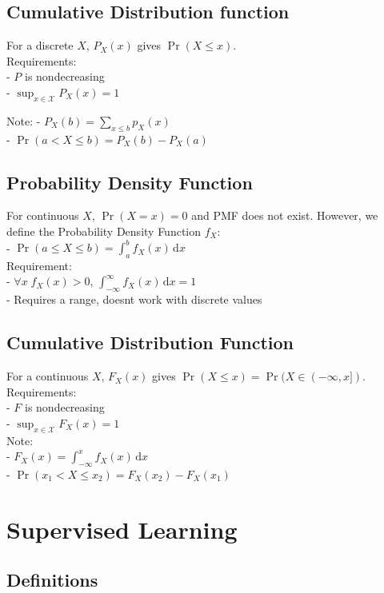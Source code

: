 \documentclass[10pt,landscape,a4paper]{cheatsheet}
\newcommand{\diff}{\mathrm{\,d}}
\begin{document}
  \subsection{Cumulative Distribution function} 
  For a discrete $X$, $P_{X}(x)$ gives $\Pr(X \le x)$.\\
   Requirements:\\
    - $P$ is nondecreasing\\
    - $\sup_{x \in \mathcal{X}} P_{X}(x) = 1$

   Note:
    - $P_X(b) = \sum_{x \le b} p_X(x)$\\
    - $\Pr(a < X \le b) = P_X(b) - P_X(a)$

   \subsection{Probability Density Function}
   For continuous $X$, $\Pr(X = x) = 0$ and PMF does not exist. However, we define the Probability Density Function $f_X$:\\
    - $\Pr(a \le X \le b) = \int_{a}^{b} f_X(x) \diff x$\\
   Requirement:\\
    - $\forall x \;f_X(x) > 0$, $\int_{-\infty}^\infty f_X(x) \diff x = 1$\\
    - Requires a range, doesnt work with discrete values

   \subsection{Cumulative Distribution Function}
   For a continuous $X$, $F_{X}(x)$ gives $\Pr(X \le x) = \Pr(X \in (-\infty,x])$.\\
   Requirements: \\
    - $F$ is nondecreasing\\
    - $\sup_{x \in \mathcal{X}} F_{X}(x) = 1$\\
   Note:\\
    - $F_X(x) = \int_{-\infty}^x f_X(x) \diff x$\\
    - $\Pr(x_1 < X \le x_2) = F_X(x_2) - F_X(x_1)$

  \section{Supervised Learning}

  \subsection{Definitions}
\end{document}
